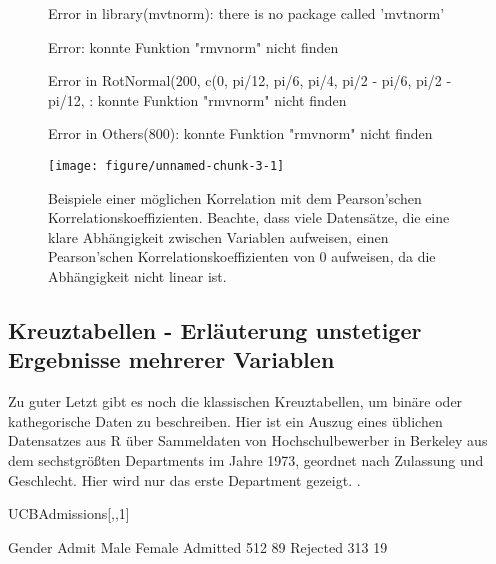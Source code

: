 \documentclass[a4paper,twoside]{tufte-book}\usepackage[]{graphicx}\usepackage[]{color}
\makeatletter
\def\maxwidth{ %
	\ifdim\Gin@nat@width>\linewidth
	\linewidth
	\else
	\Gin@nat@width
	\fi
}
\makeatother
\begin{document}
\begin{figure}[htbp]
\begin{center}
\begin{Schunk}
\begin{Soutput}
Error in library(mvtnorm): there is no package called 'mvtnorm'
\end{Soutput}
\begin{Soutput}
Error: konnte Funktion "rmvnorm" nicht finden
\end{Soutput}
\begin{Soutput}
Error in RotNormal(200, c(0, pi/12, pi/6, pi/4, pi/2 - pi/6, pi/2 - pi/12, : konnte Funktion "rmvnorm" nicht finden
\end{Soutput}
\begin{Soutput}
Error in Others(800): konnte Funktion "rmvnorm" nicht finden
\end{Soutput}

\texttt{[image: figure/unnamed-chunk-3-1]} \end{Schunk}
\caption{Beispiele einer möglichen Korrelation mit dem Pearson'schen Korrelationskoeffizienten. Beachte, dass viele Datensätze, die eine klare Abhängigkeit zwischen Variablen aufweisen, einen Pearson'schen Korrelationskoeffizienten von 0 aufweisen, da die Abhängigkeit nicht linear ist.}
\label{fig: correlation}
\end{center}
\end{figure}

\subsection{Kreuztabellen - Erläuterung unstetiger Ergebnisse mehrerer Variablen}

Zu guter Letzt gibt es noch die klassischen Kreuztabellen, um binäre oder kathegorische Daten zu beschreiben. Hier ist ein Auszug eines üblichen Datensatzes aus R über Sammeldaten von Hochschulbewerber in Berkeley aus dem sechstgrößten Departments im Jahre 1973, geordnet nach Zulassung und Geschlecht. Hier wird nur das erste Department gezeigt.
.

\begin{Schunk}
\begin{Sinput}
UCBAdmissions[,,1]
\end{Sinput}
\begin{Soutput}
          Gender
Admit      Male Female
  Admitted  512     89
  Rejected  313     19
\end{Soutput}
\end{Schunk}
\end{document}
